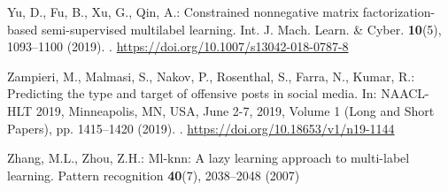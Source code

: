\documentclass{article}
\begin{document}
\begin{thebibliography}{10}
Yu, D., Fu, B., Xu, G., Qin, A.: Constrained nonnegative matrix
  factorization-based semi-supervised multilabel learning.
\newblock Int. J. Mach. Learn. {\&} Cyber. \textbf{10}(5), 1093--1100 (2019).
\newblock {}.
\newblock \urlprefix\url{https://doi.org/10.1007/s13042-018-0787-8}

Zampieri, M., Malmasi, S., Nakov, P., Rosenthal, S., Farra, N., Kumar, R.:
  Predicting the type and target of offensive posts in social media.
\newblock In: {NAACL-HLT} 2019, Minneapolis, MN, USA, June 2-7, 2019, Volume 1
  (Long and Short Papers), pp. 1415--1420 (2019).
\newblock {}.
\newblock \urlprefix\url{https://doi.org/10.18653/v1/n19-1144}

Zhang, M.L., Zhou, Z.H.: Ml-knn: A lazy learning approach to multi-label
  learning.
\newblock Pattern recognition \textbf{40}(7), 2038--2048 (2007)

\end{thebibliography}
 
\end{document}
